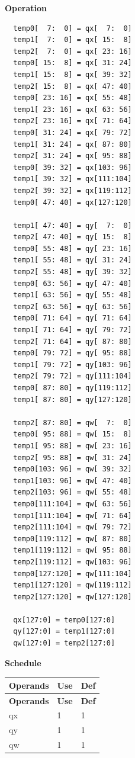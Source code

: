 \textbf{Operation}\\
\begin{lstlisting}
  temp0[  7:  0] = qx[  7:  0]
  temp1[  7:  0] = qx[ 15:  8]
  temp2[  7:  0] = qx[ 23: 16]
  temp0[ 15:  8] = qx[ 31: 24]
  temp1[ 15:  8] = qx[ 39: 32]
  temp2[ 15:  8] = qx[ 47: 40]
  temp0[ 23: 16] = qx[ 55: 48]
  temp1[ 23: 16] = qx[ 63: 56]
  temp2[ 23: 16] = qx[ 71: 64]
  temp0[ 31: 24] = qx[ 79: 72]
  temp1[ 31: 24] = qx[ 87: 80]
  temp2[ 31: 24] = qx[ 95: 88]
  temp0[ 39: 32] = qx[103: 96]
  temp1[ 39: 32] = qx[111:104]
  temp2[ 39: 32] = qx[119:112]
  temp0[ 47: 40] = qx[127:120]

  temp1[ 47: 40] = qy[  7:  0]
  temp2[ 47: 40] = qy[ 15:  8]
  temp0[ 55: 48] = qy[ 23: 16]
  temp1[ 55: 48] = qy[ 31: 24]
  temp2[ 55: 48] = qy[ 39: 32]
  temp0[ 63: 56] = qy[ 47: 40]
  temp1[ 63: 56] = qy[ 55: 48]
  temp2[ 63: 56] = qy[ 63: 56]
  temp0[ 71: 64] = qy[ 71: 64]
  temp1[ 71: 64] = qy[ 79: 72]
  temp2[ 71: 64] = qy[ 87: 80]
  temp0[ 79: 72] = qy[ 95: 88]
  temp1[ 79: 72] = qy[103: 96]
  temp2[ 79: 72] = qy[111:104]
  temp0[ 87: 80] = qy[119:112]
  temp1[ 87: 80] = qy[127:120]

  temp2[ 87: 80] = qw[  7:  0]
  temp0[ 95: 88] = qw[ 15:  8]
  temp1[ 95: 88] = qw[ 23: 16]
  temp2[ 95: 88] = qw[ 31: 24]
  temp0[103: 96] = qw[ 39: 32]
  temp1[103: 96] = qw[ 47: 40]
  temp2[103: 96] = qw[ 55: 48]
  temp0[111:104] = qw[ 63: 56]
  temp1[111:104] = qw[ 71: 64]
  temp2[111:104] = qw[ 79: 72]
  temp0[119:112] = qw[ 87: 80]
  temp1[119:112] = qw[ 95: 88]
  temp2[119:112] = qw[103: 96]
  temp0[127:120] = qw[111:104]
  temp1[127:120] = qw[119:112]
  temp2[127:120] = qw[127:120]

  qx[127:0] = temp0[127:0]
  qy[127:0] = temp1[127:0]
  qw[127:0] = temp2[127:0]

\end{lstlisting}

\textbf{Schedule}\\
\begin{longtable}[c]{|l|l|l|}
    \hline
    \rowcolor{lightgray}
    \textbf{Operands} & \textbf{Use} & \textbf{Def} \\\hline
    \endfirsthead
    \hline
    \rowcolor{lightgray}
     \textbf{Operands} & \textbf{Use} & \textbf{Def} \\\hline
    \endhead
    \hline
    \endfoot

  qx & 1 & 1 \\\hline
  qy & 1 & 1 \\\hline
  qw & 1 & 1

\end{longtable}

